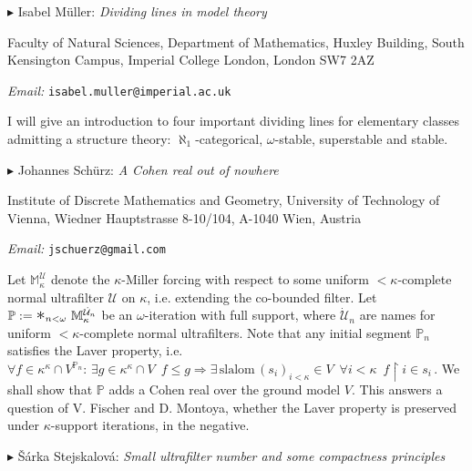 \documentclass[a4paper]{amsart}
\theoremstyle{remark}
\renewcommand{\restriction}{\mathbin\upharpoonright}
\newcommand{\vsp}{\vspace{20pt}}
\begin{document}
\vsp 

\noindent 
$\blacktriangleright$ Isabel M\"uller: \emph{Dividing lines in model theory} 

\noindent 
Faculty of Natural Sciences, Department of Mathematics, 
Huxley Building, 
South Kensington Campus, 
Imperial College London, 
London 
SW7 2AZ

\noindent 
\emph{Email:} \texttt{isabel.muller@imperial.ac.uk}

I will give an introduction to four important dividing lines for elementary classes admitting a structure theory: $\aleph_1$-categorical, $\omega$-stable, superstable and stable. 








\vsp 

\newpage 

\noindent 
$\blacktriangleright$ Johannes Sch\"urz: \emph{A Cohen real out of nowhere} 

\noindent 
Institute of Discrete Mathematics and Geometry, 
University of Technology of Vienna, 
Wiedner Hauptstrasse 8-10/104, 
A-1040 Wien, 
Austria 

\noindent 
\emph{Email:} \texttt{jschuerz@gmail.com}

Let $\mathbb{M}_\kappa ^{\mathcal{U}}$ denote the $\kappa$-Miller forcing with respect to some uniform ${<} \kappa$-complete normal ultrafilter $\mathcal{U}$ on $\kappa$, i.e. extending the co-bounded filter. 
Let $\mathbb{P}:= \mathlarger{\mathlarger{\mathlarger{*}}} _{n < \omega} \,\, \mathbb{M}_\kappa ^{\dot{\mathcal{U}}_n}$ be an $\omega$-iteration with full support, where $\dot{\mathcal{U}}_n$ are names for uniform ${<} \kappa$-complete normal ultrafilters. Note that any initial segment $\mathbb{P}_n$ satisfies the Laver property, i.e. 
$\forall f \in \kappa^{\kappa} \cap V^{\mathbb{P}_n}\colon \, \exists g \in \kappa^{\kappa} \cap V \,\,\,  f \leq g \Rightarrow \exists \, \text{slalom} \, (s_i)_{i < \kappa} \in V \,\,\, \forall i < \kappa \,\,\, f \restriction i \in s_i \, .$
 We shall show that $\mathbb{P}$ adds a Cohen real over the ground model $V$. This answers a question of V. Fischer and D. Montoya, whether the Laver property is preserved under $\kappa$-support iterations, in the negative.\\





\bigskip

\noindent 
$\blacktriangleright$ \v{S}\'{a}rka Stejskalov\'{a}: \emph{Small ultrafilter number and some compactness principles} 
\end{document}
